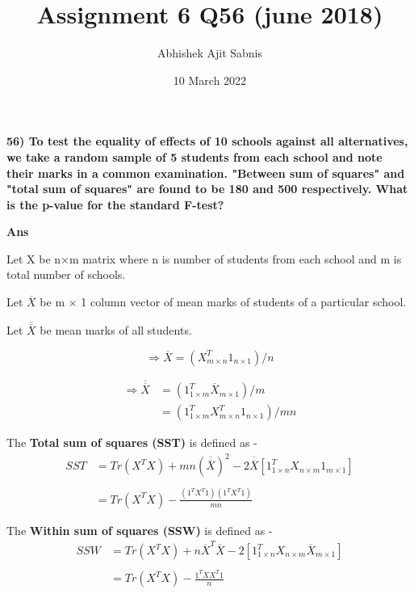 \documentclass{article}
\title{\textbf{Assignment 6 Q56 (june 2018)}}
\author{Abhishek Ajit Sabnis}
\date{10 March 2022}
\begin{document}
\maketitle

\textbf{56) To test the equality of effects of 10 schools against all alternatives, we take a random sample of 5 students from each school and note their marks in a common examination. "Between sum of squares" and "total sum of squares" are found to be 180 and 500 respectively. What is the p-value for the standard F-test?}

\vspace{0.5cm}

\textbf{Ans} 

Let X be n$\times$m matrix where n is number of students from each school and m is total   number of schools. 

Let $\overline{X}$ be m $\times$ 1 column vector of mean marks of students of a particular school.

Let $\overline{\overline{X}}$ be mean marks of all students.

\begin{equation}
    \Rightarrow \overline{X} = (X^T_{m\times n} 1_{n\times 1})/n
\end{equation}

\begin{equation}
\begin{split}
    \Rightarrow \overline{\overline{X}} & = (1^T_{1\times m} \overline{X}_{m\times 1})/m \\
      & = (1^T_{1\times m} X^T_{m\times n} 1_{n\times 1})/mn
\end{split}
\end{equation}

\vspace{0.3cm}

The \textbf{Total sum of squares (SST)} is defined as - 
\begin{equation}
\begin{split}
    SST & = Tr(X^TX) + mn (\overline{\overline{X}})^2 - 2 \overline{\overline{X}} [1^T_{1\times n} X_{n\times m} 1_{m\times 1}] \\
        \\
        & = Tr(X^T X) - \frac{(1^T X^T 1)(1^T X^T 1)}{mn}
\end{split}
\end{equation}

The \textbf{Within sum of squares (SSW)} is defined as - 
\begin{equation}
\begin{split}
    SSW &= Tr(X^TX) + n \overline{X}^T \overline{X} - 2 [1^T_{1\times n} X_{n\times m} \overline{X}_{m\times 1}] \\
      \\
       &= Tr(X^TX) - \frac{1^T X X^T 1}{n}
\end{split}
\end{equation}
\end{document}
